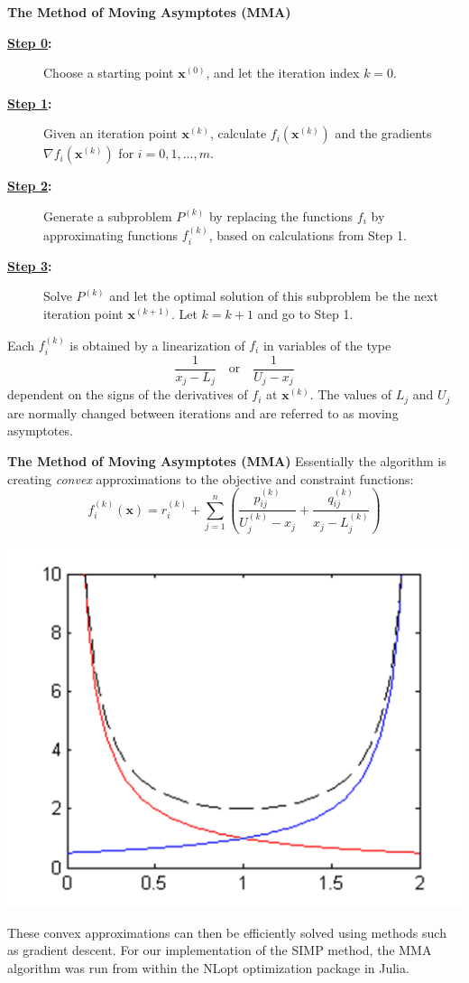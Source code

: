 \documentclass[final]{beamer}
\begin{document}
{\small
\begin{frame}[t]{\textbf{The Method of Moving Asymptotes (MMA)}}
	\begin{description}
		\item[\textbf{\underline{Step 0}:}] Choose a starting point $\mathbf{x}^{(0)}$, and let the iteration index $k=0$.
		\item[\textbf{\underline{Step 1}:}] Given an iteration point $\mathbf{x}^{(k)}$, calculate $f_i(\mathbf{x}^{(k)})$ and the gradients $\nabla f_i(\mathbf{x}^{(k)})$ for $i=0,1,\ldots,m$.
		\item[\textbf{\underline{Step 2}:}] Generate a subproblem $P^{(k)}$ by replacing the functions $f_i$ by approximating functions $f_i^{(k)}$, based on calculations from Step 1.
		\item[\textbf{\underline{Step 3}:}] Solve $P^{(k)}$ and let the optimal solution of this subproblem be the next iteration point $\mathbf{x}^{(k+1)}$. Let $k=k+1$ and go to Step 1.
	\end{description}\pause
	Each $f_i^{(k)}$ is obtained by a linearization of $f_i$ in variables of the type $$\frac{1}{x_j-L_j}\quad\text{or}\quad\frac{1}{U_j-x_j}$$ dependent on the signs of the derivatives of $f_i$ at $\mathbf{x}^{(k)}$. The values of $L_j$ and $U_j$ are normally changed between iterations and are referred to as moving asymptotes.
\end{frame}
}

\begin{frame}{\textbf{The Method of Moving Asymptotes (MMA)}}
	Essentially the algorithm is creating \textit{convex} approximations to the objective and constraint functions: $$f_i^{(k)}(\mathbf{x})=r_i^{(k)}+\sum\limits_{j=1}^{n}\left(\frac{p_{ij}^{(k)}}{U_j^{(k)}-x_j}+\frac{q_{ij}^{(k)}}{x_j-L_j^{(k)}}\right)$$\vfill\pause
	\begin{center}
		\includegraphics[width=0.4\linewidth]{MMA-pic.png}\cite{Keulen}
	\end{center}\pause
	These convex approximations can then be efficiently solved using methods such as gradient descent.\vfill\pause
	For our implementation of the SIMP method, the MMA algorithm was run from within the NLopt optimization package in Julia.\vfill
\end{frame}
\end{document}
